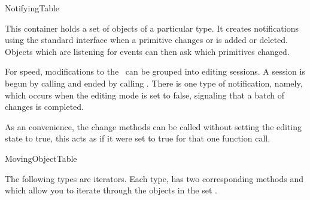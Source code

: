 

\begin{ccRefConcept}{NotifyingTable}  %


\ccDefinition
  

This container holds a set of objects of a particular type. It creates
notifications using the standard  interface when a
primitive changes or is added or deleted. Objects which are listening
for events can then ask which primitives changed.

For speed, modifications to the \ccRefName\ can be grouped into
editing sessions. A session is begun by calling
 and ended by calling .
There is one type of notification, namely, 
which occurs when the editing mode is set to false, signaling that a
batch of changes is completed.

As an convenience, the change methods can be called without setting
the editing state to true, this acts as if it were set to true for
that one function call.

\ccIsModel

MovingObjectTable

\ccTypes




The following types are iterators. Each type,  has two corresponding methods  and  which allow you to iterate through the objects in the set .



\end{ccRefConcept}
